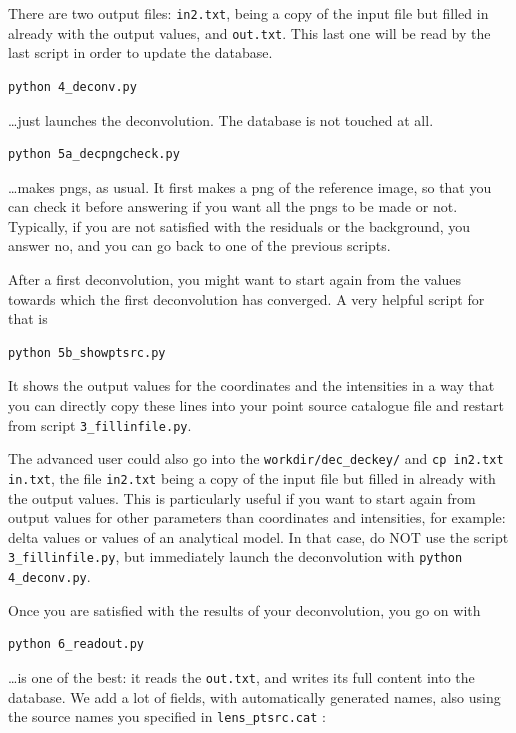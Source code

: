 There are two output files: \verb+in2.txt+, being a copy of the input file but filled in already with the output values, and \verb+out.txt+. This last one will be read by the last script in order to update the database.


\begin{Verbatim}
python 4_deconv.py
\end{Verbatim}
\ldots just launches the deconvolution. The database is not touched at all.

\begin{Verbatim}
python 5a_decpngcheck.py
\end{Verbatim}
\ldots makes pngs, as usual. It first makes a png of the reference image, so that you can check it before answering if you want all the pngs to be made or not. Typically, if you are not satisfied with the residuals or the background, you answer no, and you can go back to one of the previous scripts. 

After a first deconvolution, you might want to start again from the values towards which the first deconvolution has converged. A very helpful script for that is

\begin{Verbatim}
python 5b_showptsrc.py
\end{Verbatim}
It shows the output values for the coordinates and the intensities in a way that you can directly copy these lines into your point source catalogue file and restart from script \verb+3_fillinfile.py+.

The advanced user could also go into the \verb+workdir/dec_deckey/+ and \verb+cp in2.txt in.txt+, the file \verb+in2.txt+ being a copy of the input file but filled in already with the output values. This is particularly useful if you want to start again from output values for other parameters than coordinates and intensities, for example: delta values or values of an analytical model. In that case, do NOT use the script \verb+3_fillinfile.py+, but immediately launch the deconvolution with \verb+python 4_deconv.py+.

Once you are satisfied with the results of your deconvolution, you go on with

\begin{Verbatim}
python 6_readout.py
\end{Verbatim}

\ldots is one of the best: it reads the \verb+out.txt+, and writes its full content into the database. We add a lot of fields, with automatically generated names, also using the source names you specified in \verb+lens_ptsrc.cat+ :

